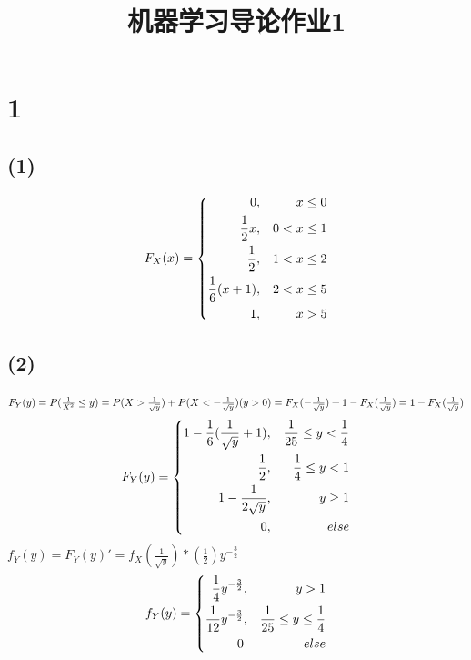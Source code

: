 \documentclass{article}
\title{机器学习导论作业1}
\begin{document}
\maketitle
\section*{1}\noindent
\subsection*{(1)}\noindent
\begin{equation}\noindent
F_X(x)=\left\{
\begin{aligned}
0 & , & x\le 0 \\
\frac{1}{2}x & , & 0<x\le 1\\
\frac{1}{2}  & , & 1<x\le 2\\
\frac{1}{6}(x+1) &,&2<x\le 5\\
1 &,&x>5
\end{aligned}
\right.
\end{equation}\noindent
\subsection*{(2)}\noindent
$F_Y(y)=P(\frac{1}{X^2}\le y)=P(X>\frac{1}{\sqrt{y}})+P(X<-\frac{1}{\sqrt{y}})(y>0)
\\=F_X(-\frac{1}{\sqrt{y}})+1-F_X(\frac{1}{\sqrt{y}})
=1-F_X(\frac{1}{\sqrt{y}})$\\
\begin{equation}\noindent
F_Y(y)=\left\{
\begin{aligned}
1-\frac{1}{6}(\frac{1}{\sqrt{y}}+1)&,&\frac{1}{25}\le y<\frac{1}{4}\\
\frac{1}{2}&,&\frac{1}{4}\le y<1\\
1-\frac{1}{2\sqrt{y}}&,&y\ge 1\\
0&,& else\\
\end{aligned}
\right.
\end{equation}
$f_Y(y)=F_Y(y)'=f_X(\frac{1}{\sqrt{y}})*(\frac{1}{2})y^{-\frac{3}{2}}$
\begin{equation}\noindent
f_Y(y)=\left\{
\begin{aligned}
\frac{1}{4}y^{-\frac{3}{2}}&,&y>1\\
\frac{1}{12}y^{-\frac{3}{2}}&,&\frac{1}{25}\le y\le\frac{1}{4}\\
0&&else\\
\end{aligned}
\right.
\end{equation}
\end{document}
